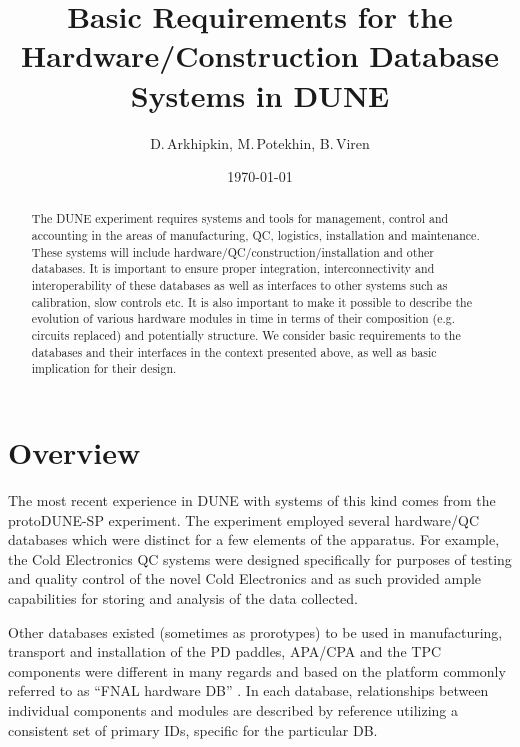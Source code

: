 \documentclass[pdftex,12pt,letter]{article}
\title{Basic Requirements for the Hardware/Construction Database Systems in DUNE}
\date{\today}
\author{D.\,Arkhipkin, M.\,Potekhin, B.\,Viren}
\begin{document}
\maketitle

\begin{abstract}
\noindent  The DUNE experiment requires systems and tools for management, control
and accounting  in the areas of manufacturing, QC, logistics, installation and maintenance.
These systems will include hardware/QC/construction/installation and other databases.
It is important to ensure proper integration, interconnectivity and interoperability of these
databases  as well as interfaces to other systems such as calibration, slow controls etc.
It is also important to make it possible to describe the evolution of various hardware modules
in time in terms of their composition (e.g. circuits replaced) and potentially structure.
We consider basic requirements to the databases and their interfaces  in the context
presented above, as well as basic implication for their design.


\end{abstract}


\section{Overview}

The most recent experience in DUNE with systems of this kind comes from the protoDUNE-SP
experiment. The experiment employed several hardware/QC databases which were distinct
for a few elements of the apparatus. For example, the Cold Electronics QC systems were designed specifically
for purposes of testing and quality control of the novel Cold Electronics and as such provided ample capabilities
for storing and analysis of the data collected.

Other databases existed (sometimes as prorotypes) to be used in manufacturing, transport and installation of the PD
paddles, APA/CPA and the TPC components were different in many regards and based on the platform commonly
referred to as ``FNAL hardware DB'' \cite{hardwareDB}. In each database, relationships between individual components
and modules are described by reference utilizing a consistent set of primary IDs, specific for the particular DB.
\end{document}
